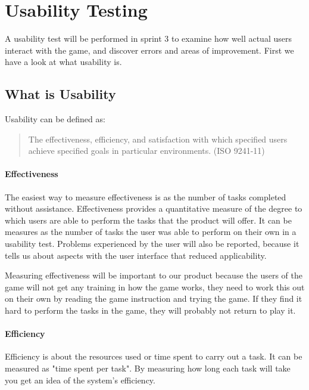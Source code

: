 \section{Usability Testing}

	A usability test will be performed in sprint 3 to examine how well actual users interact with the game, and	discover errors and areas of improvement. First we have a look at what usability is.

\subsection{What is Usability}

	Usability can be defined as:

	\begin{quote}
	The effectiveness, efficiency, and satisfaction with which specified users 
	achieve specified goals in particular environments. (ISO 9241-11) \cite{ISOusability}
	\end{quote}

	\paragraph{Effectiveness}

		The easiest way to measure effectiveness is as the number of tasks completed without assistance. Effectiveness provides a quantitative measure of the degree to which users are able to perform the tasks that the product will offer. It can be measures as the number of tasks the user was able to perform on their own in a usability test. Problems experienced by the user will also be reported, because it tells us about aspects with the user interface that reduced applicability.

		Measuring effectiveness will be important to our product because the users of the game will not get any training in how the game works, they need to work this out on their own by reading the game instruction and trying the game. If they find it hard to perform the tasks in the game, they will probably not return to play it.

	\paragraph{Efficiency}

		Efficiency is about the resources used or time spent to carry out a task. It can be measured as "time spent per task".
		By measuring how long each task will take you get an idea of the system's efficiency.

